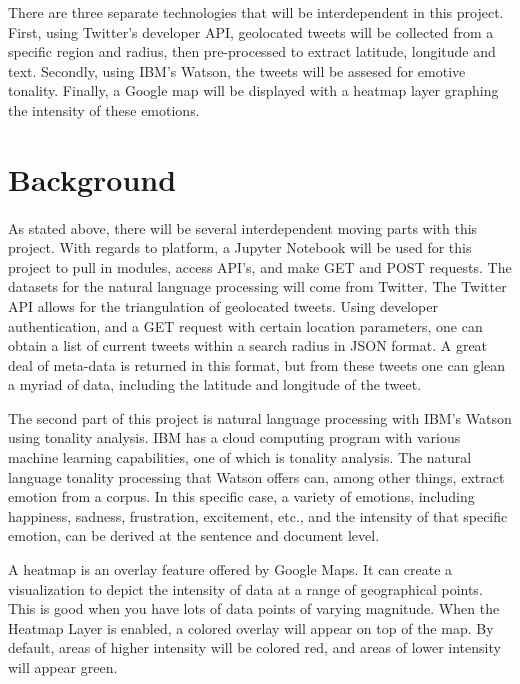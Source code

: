 \documentclass[12pt, oneside]{article}
\begin{document}
There are three separate technologies that will be interdependent in this
project. First, using Twitter's developer API, geolocated tweets will be
collected from a specific region and radius, then pre-processed to extract
latitude, longitude and text. Secondly, using IBM's Watson, the tweets will be
assesed for emotive tonality. Finally, a Google map will be displayed with a
heatmap layer graphing the intensity of these emotions.


\section{Background}
\paragraph{}
As stated above, there will be several interdependent moving parts with this
project. With regards to platform, a Jupyter Notebook will be used for this
project to pull in modules, access API's, and make GET and POST requests.
The datasets for the natural language processing will come from Twitter. The
Twitter API allows for the triangulation of geolocated tweets\cite{TwitterGeo}.
Using developer authentication, and a GET request with certain location
parameters, one can obtain a list of current tweets within a search radius in
JSON format. A great deal of meta-data is returned in this format, but from
these tweets one can glean a myriad of data, including the latitude and
longitude of the tweet.

The second part of this project is natural language processing with IBM's
Watson using tonality analysis.
IBM has a cloud computing program with various machine learning
capabilities\cite{IBM}, one of which is tonality analysis. The natural language
tonality processing that Watson offers can, among other things, extract emotion
from a corpus. In this specific case, a variety of emotions, including happiness, sadness, frustration, excitement, etc., and the intensity of that specific emotion, can be
derived at the sentence and document level.

A heatmap is an overlay feature offered by Google Maps. It can create a
visualization to depict the intensity of data at a range of geographical points.
This is good when you have lots of data points of varying magnitude. When the
Heatmap Layer is enabled, a colored overlay will appear on top of the map. By
default, areas of higher intensity will be colored red, and areas of lower
intensity will appear green\cite{Google}.
\end{document}
